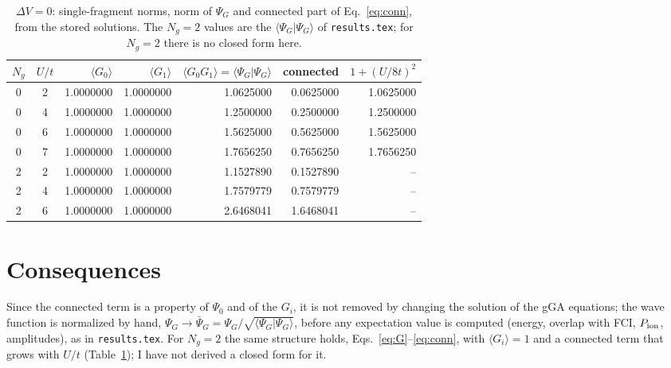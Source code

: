 \documentclass[11pt]{article}
\newcommand{\Ng}{N_g}
\newcommand{\dV}{\Delta V}
\begin{document}
\begin{table}[h]
\centering
\begin{tabular}{cc rrrr r}
\toprule
$\Ng$ & $U/t$ & $\langle G_0\rangle$ & $\langle G_1\rangle$ & $\langle G_0G_1\rangle=\langle\Psi_G|\Psi_G\rangle$ & connected & $1+(U/8t)^2$\\
\midrule
0 & 2 & 1.0000000 & 1.0000000 & 1.0625000 & 0.0625000 & 1.0625000\\
0 & 4 & 1.0000000 & 1.0000000 & 1.2500000 & 0.2500000 & 1.2500000\\
0 & 6 & 1.0000000 & 1.0000000 & 1.5625000 & 0.5625000 & 1.5625000\\
0 & 7 & 1.0000000 & 1.0000000 & 1.7656250 & 0.7656250 & 1.7656250\\
\midrule
2 & 2 & 1.0000000 & 1.0000000 & 1.1527890 & 0.1527890 & --\\
2 & 4 & 1.0000000 & 1.0000000 & 1.7579779 & 0.7579779 & --\\
2 & 6 & 1.0000000 & 1.0000000 & 2.6468041 & 1.6468041 & --\\
\bottomrule
\end{tabular}
\caption{$\dV=0$: single-fragment norms, norm of $\Psi_G$ and connected part of Eq.~\eqref{eq:conn}, from the stored solutions. The $\Ng=2$ values are the $\langle\Psi_G|\Psi_G\rangle$ of \texttt{results.tex}; for $\Ng=2$ there is no closed form here.}
\label{tab:norm}
\end{table}

\section{Consequences}
Since the connected term is a property of $\Psi_0$ and of the $G_i$, it is not removed by changing the solution of the gGA equations; the wave function is normalized by hand,
$\Psi_G\to\bar\Psi_G=\Psi_G/\sqrt{\langle\Psi_G|\Psi_G\rangle}$, before any expectation value is computed (energy, overlap with FCI, $P_{\rm ion}$, amplitudes), as in \texttt{results.tex}. For $\Ng=2$ the same structure holds, Eqs.~\eqref{eq:G}--\eqref{eq:conn}, with $\langle G_i\rangle=1$ and a connected term that grows with $U/t$ (Table~\ref{tab:norm}); I have not derived a closed form for it.
\end{document}
